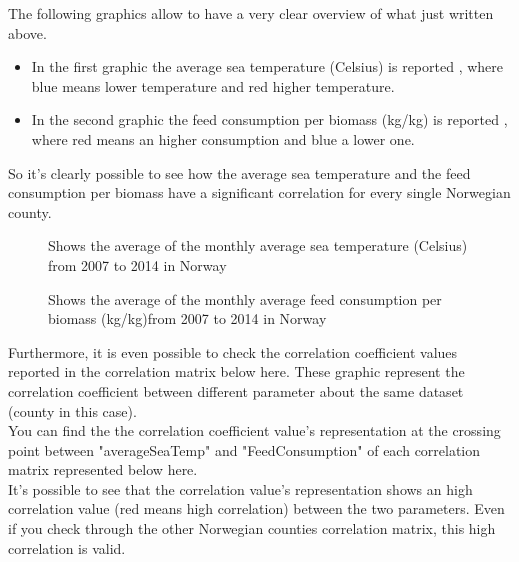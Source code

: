 \newpage

The following graphics allow to have a very clear overview of what just written above.\\
\vspace{-10mm}
\begin{itemize}
 \setlength{\itemsep}{-5pt}
 \item In the first graphic the average sea temperature (Celsius) is reported , where blue means lower temperature and red higher temperature.
 \item In the second graphic the feed consumption per biomass (kg/kg) is reported , where red means an higher consumption and blue a lower one.
\end{itemize}

So it's clearly possible to see how the average sea temperature and the feed consumption per biomass have a significant correlation for every single Norwegian county.

\begin{figure}[H]
    \caption[Map: monthly average sea temperature in Norway]{Shows the average of the monthly average sea temperature (Celsius) from 2007 to 2014 in Norway}
    \label{fig: Norway_averageSeaTemp}
\end{figure}

\begin{figure}[H]
    \caption[Map: monthly average feed consumption / biomass in Norway]{Shows the average of the monthly average feed consumption per biomass (kg/kg)from 2007 to 2014 in Norway}
    \label{fig: Norway_feed-biomass}
\end{figure}

\newpage

Furthermore, it is even possible to check the correlation coefficient values reported in the correlation matrix below here. These graphic represent the correlation coefficient between different parameter about the same dataset (county in this case).\\
You can find the the correlation coefficient value's representation at the crossing point between "averageSeaTemp" and "FeedConsumption" of each correlation matrix represented below here.\\
It's possible to see that the correlation value's representation shows an high correlation value (red means high correlation) between the two parameters. Even if you check through the other Norwegian counties correlation matrix, this high correlation is valid.\\


